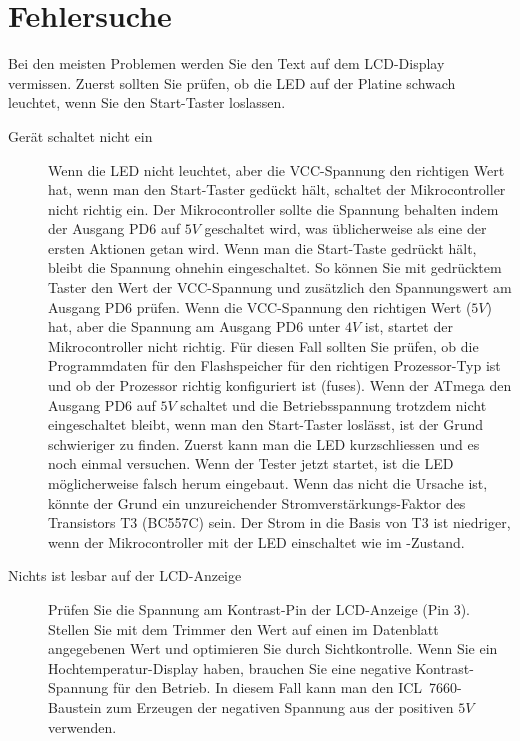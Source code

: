 \section{Fehlersuche}
Bei den meisten Problemen werden Sie den Text auf dem LCD-Display vermissen.
Zuerst sollten Sie prüfen, ob die LED auf der Platine schwach leuchtet, wenn Sie den Start-Taster
loslassen.
\begin{description}

\item[Gerät schaltet nicht ein]  
Wenn die LED nicht leuchtet, aber die VCC-Spannung den richtigen Wert hat, wenn
man den Start-Taster gedückt hält, schaltet der Mikrocontroller nicht richtig ein.
Der Mikrocontroller sollte die Spannung behalten indem der Ausgang PD6 auf \(5V\)
geschaltet wird, was üblicherweise als eine der ersten Aktionen getan wird.
Wenn man die Start-Taste gedrückt hält, bleibt die Spannung ohnehin eingeschaltet.
So können Sie mit gedrücktem Taster den Wert der VCC-Spannung und zusätzlich den Spannungswert am
Ausgang PD6 prüfen.
Wenn die VCC-Spannung den richtigen Wert (\(5V\)) hat, aber die Spannung am Ausgang
PD6 unter \(4V\) ist, startet der Mikrocontroller nicht richtig.
Für diesen Fall sollten Sie prüfen, ob die Programmdaten für den Flashspeicher
für den richtigen Prozessor-Typ ist und ob der Prozessor richtig konfiguriert ist (fuses).
Wenn der ATmega den Ausgang PD6 auf \(5V\) schaltet und die Betriebsspannung 
trotzdem nicht eingeschaltet bleibt, wenn man den Start-Taster loslässt, ist der
Grund schwieriger zu finden.
Zuerst kann man die LED kurzschliessen und es noch einmal versuchen.
Wenn der Tester jetzt startet, ist die LED möglicherweise falsch herum eingebaut.
Wenn das nicht die Ursache ist, könnte der Grund ein unzureichender Stromverstärkungs-Faktor
des Transistors T3 (BC557C) sein.
Der Strom in die Basis von T3 ist niedriger, wenn der Mikrocontroller mit der LED einschaltet
		wie im -Zustand.

\item[Nichts ist lesbar auf der LCD-Anzeige] 
Prüfen Sie die Spannung am Kontrast-Pin der LCD-Anzeige (Pin 3).
Stellen Sie mit dem Trimmer den Wert auf einen im Datenblatt angegebenen Wert und optimieren Sie
durch Sichtkontrolle.
Wenn Sie ein Hochtemperatur-Display haben, brauchen Sie eine negative Kontrast-Spannung für
den Betrieb.
In diesem Fall kann man den ICL~7660-Baustein zum Erzeugen der negativen Spannung aus der
positiven \(5V\) verwenden.


\end{description}
